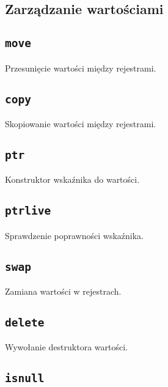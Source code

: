 \subsection{Zarządzanie wartościami}
\label{viua_vm_ops_value_management}

\subsection{\texttt{move}}

Przesunięcie wartości między rejestrami.

\subsection{\texttt{copy}}

Skopiowanie wartości między rejestrami.

\subsection{\texttt{ptr}}

Konstruktor wskaźnika do wartości.

\subsection{\texttt{ptrlive}}

Sprawdzenie poprawności wskaźnika.

\subsection{\texttt{swap}}

Zamiana wartości w rejestrach.

\subsection{\texttt{delete}}

Wywołanie destruktora wartości.

\subsection{\texttt{isnull}}
